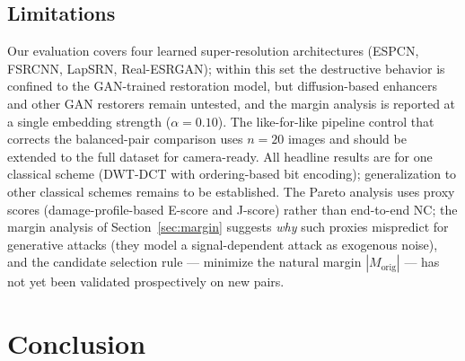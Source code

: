 \documentclass[conference]{IEEEtran}
\begin{document}
\subsection{Limitations}
Our evaluation covers four learned super-resolution architectures
(ESPCN, FSRCNN, LapSRN, Real-ESRGAN); within this set the destructive
behavior is confined to the GAN-trained restoration model, but
diffusion-based enhancers and other GAN restorers remain untested, and
the margin analysis is reported at a single embedding strength
($\alpha=0.10$). The like-for-like pipeline control that corrects the
balanced-pair comparison uses $n=20$ images and should be extended to
the full dataset for camera-ready. All headline results are for one
classical scheme (DWT-DCT with ordering-based bit encoding);
generalization to other classical schemes remains to be established.
The Pareto analysis uses proxy scores (damage-profile-based E-score and
J-score) rather than end-to-end NC; the margin analysis of
Section~\ref{sec:margin} suggests \emph{why} such proxies mispredict
for generative attacks (they model a signal-dependent attack as
exogenous noise), and the candidate selection rule --- minimize the
natural margin $|M_{\mathrm{orig}}|$ --- has not yet been validated
prospectively on new pairs.

\section{Conclusion}
\label{sec:conclusion}
\end{document}
